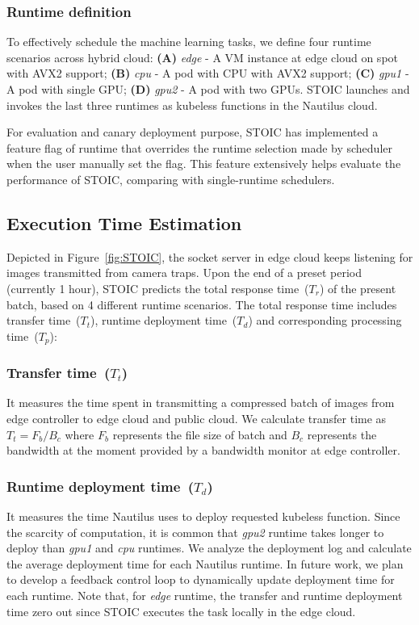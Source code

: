  \BlankLine
 \subsubsection{Runtime definition}
 To effectively schedule the machine learning tasks, we define four runtime scenarios across hybrid cloud: \textbf{(A)} \textit{edge} - A VM instance at edge cloud on spot with AVX2 support; \textbf{(B)} \textit{cpu} - A pod with CPU with AVX2 support; \textbf{(C)} \textit{gpu1} - A pod with single GPU; \textbf{(D)} \textit{gpu2} - A pod with two GPUs. STOIC launches and invokes the last three runtimes as kubeless functions in the Nautilus cloud. 
 
 For evaluation and canary deployment purpose, STOIC has implemented a feature flag of runtime that overrides the runtime selection made by scheduler when the user manually set the flag. This feature extensively helps evaluate the performance of STOIC, comparing with single-runtime schedulers.
 
 
 \subsection{Execution Time Estimation}
 Depicted in Figure~\ref{fig:STOIC}, the socket server in edge cloud keeps listening for images transmitted from camera traps. Upon the end of a preset period (currently 1 hour), STOIC predicts the total response time~($T_r$) of the present batch, based on 4 different runtime scenarios. The total response time includes transfer time~($T_t$), runtime deployment time~($T_d$) and corresponding processing time~($T_p$): 
 
 \subsubsection{Transfer time~($T_t$)} It measures the time spent in transmitting a compressed batch of images from edge controller to edge cloud and public cloud. We calculate transfer time as ${T_t = F_b / B_c}$ where $F_b$ represents the file size of batch and $B_c$ represents the bandwidth at the moment provided by a bandwidth monitor at edge controller. 
 
 \subsubsection{Runtime deployment time~($T_d$)} It measures the time Nautilus uses to deploy requested kubeless function. Since the scarcity of computation, it is common that \textit{gpu2} runtime takes longer to deploy than \textit{gpu1} and \textit{cpu} runtimes. We analyze the deployment log and calculate the average deployment time for each Nautilus runtime. In future work, we plan to develop a feedback control loop to dynamically update deployment time for each runtime. Note that, for \textit{edge} runtime, the transfer and runtime deployment time zero out since STOIC executes the task locally in the edge cloud.
 
